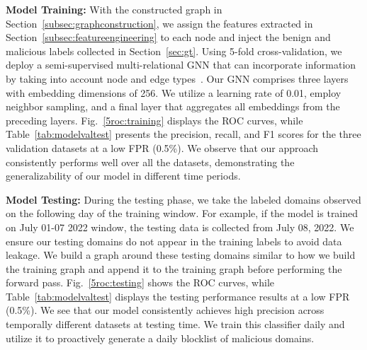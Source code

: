 \textbf{Model Training:} With the constructed graph in Section~\ref{subsec:graphconstruction}, we assign the features extracted in Section~\ref{subsec:featureengineering} to each node and inject the benign and malicious labels collected in Section~\ref{sec:gt}.  Using 5-fold cross-validation, we deploy a semi-supervised multi-relational GNN that can incorporate information by taking into account node and edge types~\cite{schlichtkrull:multignn2018}. Our GNN comprises three layers with embedding dimensions of 256. We utilize a learning rate of 0.01, employ neighbor sampling, and a final layer that aggregates all embeddings from the preceding layers.
Fig.~\ref{5roc:training} displays the ROC curves, while Table~\ref{tab:modelvaltest} presents the precision, recall, and F1 scores for the three validation datasets at a low FPR (0.5\%). We observe that our approach consistently performs well over all the datasets, demonstrating the generalizability of our model in different time periods. 
\begin{table}
\centering
\caption{Datasets used in blocklist generation experiments.}

\label{tab:dataset}
\end{table}


\textbf{Model Testing:} During the testing phase, we take the labeled domains observed on the following day of the training window. For example, if the model is trained on July 01-07 2022 window, the testing data is collected from July 08, 2022. We ensure our testing domains do not appear in the training labels to avoid data leakage. We build a graph around these testing domains similar to how we build the training graph and append it to the training graph before performing the forward pass. Fig.~\ref{5roc:testing} shows the ROC curves, while Table~\ref{tab:modelvaltest} displays the testing performance results at a low FPR (0.5\%).
We see that our model consistently achieves high precision across temporally different datasets at testing time. We train this classifier daily and utilize it to proactively generate a daily blocklist of malicious domains.

